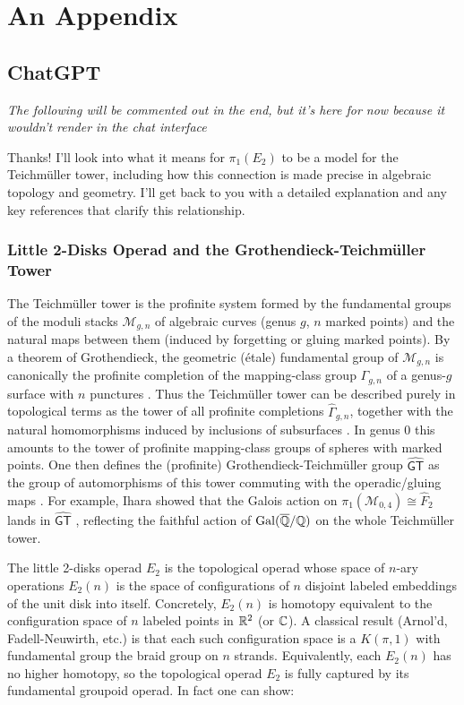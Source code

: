 \chapter{An Appendix}
\section{ChatGPT}
\emph{The following will be commented out in the end, but it's here for now because it wouldn't render in the chat interface}

Thanks! I'll look into what it means for $\pi_1(E_2)$ to be a model for the Teichm\"uller tower, including how this connection is made precise in algebraic topology and geometry.
I'll get back to you with a detailed explanation and any key references that clarify this relationship.


\subsection{Little 2-Disks Operad and the Grothendieck-Teichm\"uller Tower}

The Teichm\"uller tower is the profinite system formed by the fundamental groups of the moduli stacks $\mathcal{M}_{g,n}$ of algebraic curves (genus $g$, $n$ marked points) and the natural maps between them (induced by forgetting or gluing marked points).  By a theorem of Grothendieck, the geometric (\'etale) fundamental group of $\mathcal{M}_{g,n}$ is canonically the profinite completion of the mapping-class group $\Gamma_{g,n}$ of a genus-$g$ surface with $n$ punctures \cite{de_Brito_Horel_Robertson_2019}. Thus the Teichm\"uller tower can be described purely in topological terms as the tower of all profinite completions $\widehat\Gamma_{g,n}$, together with the natural homomorphisms induced by inclusions of subsurfaces \cite{Borghi_Robertson_2025}. In genus 0 this amounts to the tower of profinite mapping-class groups of spheres with marked points.  One then defines the (profinite) Grothendieck-Teichm\"uller group $\widehat{\mathsf{GT}}$ as the group of automorphisms of this tower commuting with the operadic/gluing maps \cite{de_Brito_Horel_Robertson_2019}. For example, Ihara showed that the Galois action on $\pi_1(\mathcal{M}_{0,4})\cong\widehat F_2$ lands in $\widehat{\mathsf{GT}}$ \cite{de_Brito_Horel_Robertson_2019}, reflecting the faithful action of $\mathrm{Gal}(\overline{\mathbb{Q}}/\mathbb{Q})$ on the whole Teichm\"uller tower.

The little 2-disks operad $E_2$ is the topological operad whose space of $n$-ary operations $E_2(n)$ is the space of configurations of $n$ disjoint labeled embeddings of the unit disk into itself.  Concretely, $E_2(n)$ is homotopy equivalent to the configuration space of $n$ labeled points in $\mathbb{R}^2$ (or $\mathbb{C}$).  A classical result (Arnol'd, Fadell-Neuwirth, etc.) is that each such configuration space is a $K(\pi,1)$ with fundamental group the braid group on $n$ strands.  Equivalently, each $E_2(n)$ has no higher homotopy, so the topological operad $E_2$ is fully captured by its fundamental groupoid operad.  In fact one can show:

